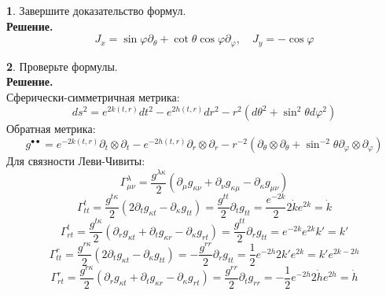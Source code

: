 \documentclass[12pt]{article}
\theoremstyle{definition}
\newtheorem{zad}{}[section]
\begin{document}
\begin{zad}
Завершите доказательство формул.\\
\textbf{Решение.}
\begin{equation}
    J_x=\sin\varphi\partial_\theta+\cot\theta\cos\varphi\partial_\varphi,\quad J_y=-\cos\varphi
\end{equation}
\end{zad}
\begin{zad}
Проверьте формулы.\\
\textbf{Решение.}\\
Сферически-симметричная метрика:
\begin{equation}
    ds^2=e^{2k(t,r)}dt^2-e^{2h(t,r)}dr^2-r^{2}(d\theta^2+\sin^{2}\theta d\varphi^2)
\end{equation}
Обратная метрика:
\begin{equation}
    g^{\bullet\bullet}=e^{-2k(t,r)}\partial_t\otimes\partial_t-e^{-2h(t,r)}\partial_r\otimes\partial_r-r^{-2}(\partial_\theta\otimes\partial_\theta+\sin^{-2}\theta\partial_\varphi\otimes\partial_\varphi)
\end{equation}
Для связности Леви-Чивиты:
\begin{equation}\label{eq10}
    \Gamma^\lambda_{\mu\nu}=\frac{g^{\lambda\kappa}}{2}(\partial_\mu g_{\kappa\nu}+\partial_\nu g_{\kappa\mu}-\partial_\kappa g_{\mu\nu})
\end{equation}
\begin{equation}
    \Gamma^t_{tt}=\frac{g^{t\kappa}}{2}(2\partial_tg_{\kappa t}-\partial_\kappa g_{tt})=\frac{g^{tt}}{2}\partial_tg_{tt}=\frac{e^{-2k}}{2}2\dot{k}e^{2k}=\dot{k}
\end{equation}
\begin{equation}
    \Gamma^t_{rt}=\frac{g^{t\kappa}}{2}(\partial_rg_{\kappa t}+\partial_tg_{\kappa r}-\partial_\kappa g_{rt})=\frac{g^{tt}}{2}\partial_rg_{tt}=e^{-2k}e^{2k}k'=k'
\end{equation}
\begin{equation}
    \Gamma^r_{tt}=\frac{g^{r\kappa}}{2}(2\partial_tg_{\kappa t}-\partial_\kappa g_{tt})=-\frac{g^{rr}}{2}\partial_rg_{tt}=\frac{1}{2}e^{-2h}2k'e^{2k}=k'e^{2k-2h}
\end{equation}
\begin{equation}
    \Gamma_{rt}^r=\frac{g^{r\kappa}}{2}(\partial_rg_{\kappa t}+\partial_tg_{\kappa r}-\partial_\kappa g_{rt})=\frac{g^{rr}}{2}\partial_tg_{rr}=-\frac{1}{2}e^{-2h}2\dot{h}e^{2h}=\dot{h}
\end{equation}
\begin{equation}

\end{equation}
\end{zad}
\end{document}
